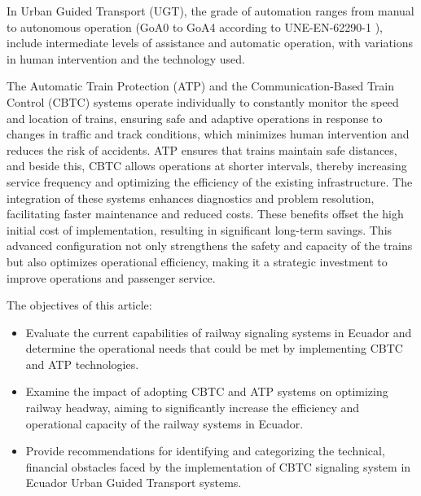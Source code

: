 \documentclass[conference]{IEEEtran}
\begin{document}
In Urban Guided Transport (UGT), the grade of automation ranges from manual to autonomous operation (GoA0 to GoA4 according to UNE-EN-62290-1 \cite{b17}), include intermediate levels of assistance and automatic operation, with variations in human intervention and the technology used.

The Automatic Train Protection (ATP) and the Communication-Based Train Control (CBTC) systems operate individually to constantly monitor the speed and location of trains, ensuring safe and adaptive operations in response to changes in traffic and track conditions, which minimizes human intervention and reduces the risk of accidents. ATP ensures that trains maintain safe distances, and beside this, CBTC allows operations at shorter intervals, thereby increasing service frequency and optimizing the efficiency of the existing infrastructure. The integration of these systems enhances diagnostics and problem resolution, facilitating faster maintenance and reduced costs. These benefits offset the high initial cost of implementation, resulting in significant long-term savings. This advanced configuration not only strengthens the safety and capacity of the trains but also optimizes operational efficiency, making it a strategic investment to improve operations and passenger service.

The objectives of this article:
\begin{itemize}
\item Evaluate the current capabilities of railway signaling systems in Ecuador and determine the operational needs that could be met by implementing CBTC and ATP technologies.
\item Examine the impact of adopting CBTC and ATP systems on optimizing railway headway, aiming to significantly increase the efficiency and operational capacity of the railway systems in Ecuador.
\item Provide recommendations for identifying and categorizing the technical, financial obstacles faced by the implementation of CBTC signaling system in Ecuador Urban Guided Transport systems.
\end{itemize}

\end{document}
